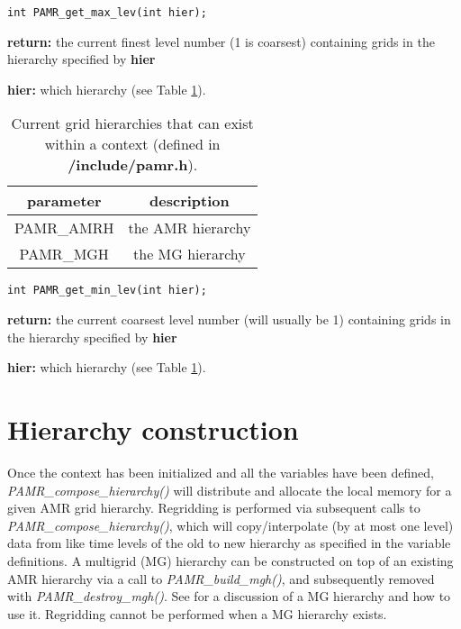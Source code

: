 \documentclass[aps,amssymb,unsortedaddress,nofootinbib]{revtex4}
\def\lsep{\itemsep 0.05in}
\begin{document}
\begin{verbatim}
int PAMR_get_max_lev(int hier);
\end{verbatim}
\begin{list}{}{\lsep}
\item {\bf return:} the current finest level number (1 is coarsest) containing grids in the hierarchy
                    specified by {\bf hier}
\item {\bf hier:} which hierarchy (see Table \ref{tab_hier}).
\end{list}

\begin{table}
\begin{center}
\begin{tabular}[t]{| c || c |}
\hline
parameter & description \\
\hline
\hline
PAMR\_AMRH  & the AMR hierarchy \\
PAMR\_MGH   & the MG hierarchy\\
\hline
\end{tabular}
\end{center}
\caption
{ Current grid hierarchies that can exist within a context (defined in {\bf /include/pamr.h}).
\label{tab_hier}}
\end{table}


\begin{verbatim}
int PAMR_get_min_lev(int hier);
\end{verbatim}
\begin{list}{}{\lsep}
\item {\bf return:} the current coarsest level number (will usually be 1) containing grids in the hierarchy
                    specified by {\bf hier}
\item {\bf hier:} which hierarchy (see Table \ref{tab_hier}).
\end{list}


\section{Hierarchy construction}
Once the context has been initialized and all the variables have been defined,
{\em PAMR\_compose\_hierarchy()} will distribute and allocate the local memory for 
a given AMR grid hierarchy. Regridding is performed via subsequent calls to
{\em PAMR\_compose\_hierarchy()}, which will copy/interpolate (by at most one level) 
data from like time levels of 
the old to new hierarchy as specified in the variable definitions. A multigrid (MG) hierarchy can
be constructed on top of an existing AMR hierarchy via a call to 
{\em PAMR\_build\_mgh()}, and subsequently removed with {\em PAMR\_destroy\_mgh()}.
See \cite{fpthesis} for a discussion of a MG hierarchy and how to use it.
Regridding cannot be performed when a MG hierarchy exists. 
\end{document}
